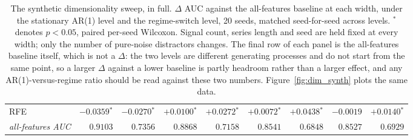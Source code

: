 \begin{table}[htbp]
\begin{tabular}{lrrrrrrrr}
    RFE & $-0.0359$$^{*}$ & $-0.0270$$^{*}$ & $+0.0100$$^{*}$ & $+0.0272$$^{*}$ & $+0.0072$$^{*}$ & $+0.0438$$^{*}$ & $-0.0019$ & $+0.0140$$^{*}$ \\
    \emph{all-features AUC} & $0.9103$ & $0.7356$ & $0.8868$ & $0.7158$ & $0.8541$ & $0.6848$ & $0.8527$ & $0.6929$ \\
    \hline
    \end{tabular}
    \caption{The synthetic dimensionality sweep, in full. $\Delta$ AUC against the all-features baseline at each width, under the stationary AR(1) level and the regime-switch level, 20 seeds, matched seed-for-seed across levels. $^{*}$ denotes $p < 0.05$, paired per-seed Wilcoxon. Signal count, series length and seed are held fixed at every width; only the number of pure-noise distractors changes. The final row of each panel is the all-features baseline itself, which is not a $\Delta$: the two levels are different generating processes and do not start from the same point, so a larger $\Delta$ against a lower baseline is partly headroom rather than a larger effect, and any AR(1)-versus-regime ratio should be read against these two numbers. Figure~\ref{fig:dim_synth} plots the same data.}
    \label{tab:syntheticsweep}
\end{table}
